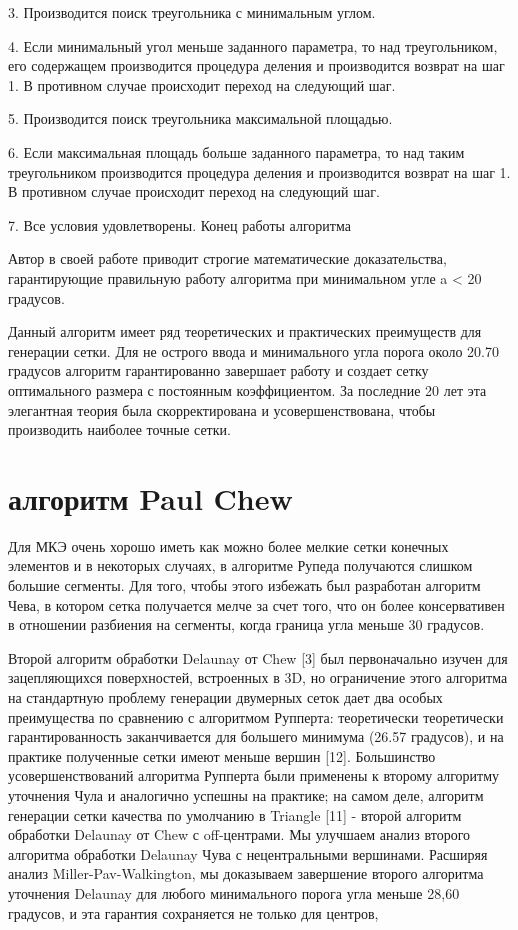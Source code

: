 \documentclass[14pt]{extreport}
\begin{document}
3. Производится поиск треугольника с минимальным углом.

4. Если минимальный угол меньше заданного параметра, то над треугольником, его содержащем производится процедура деления и производится возврат на шаг 1. В противном случае происходит переход на следующий шаг.

5. Производится поиск треугольника максимальной площадью.

6. Если максимальная площадь больше заданного параметра, то над таким треугольником производится процедура деления и производится возврат на шаг 1. В противном случае происходит переход на следующий шаг.

7. Все условия удовлетворены. Конец работы алгоритма

Автор в своей работе приводит строгие математические доказательства, гарантирующие правильную работу алгоритма при минимальном угле a < 20 градусов. 

Данный алгоритм имеет ряд теоретических и практических преимуществ для генерации сетки.  Для не острого ввода и минимального угла порога около 20.70 градусов алгоритм гарантированно завершает работу и создает сетку оптимального размера с постоянным коэффициентом. За последние 20 лет эта элегантная теория была скорректирована и усовершенствована, чтобы производить наиболее точные сетки.

\section{алгоритм Paul Chew}

Для МКЭ очень хорошо иметь как можно более мелкие сетки конечных элементов и в некоторых случаях, в алгоритме Рупеда получаются слишком большие сегменты. Для того, чтобы этого избежать был разработан алгоритм Чева, в котором сетка получается мелче за счет того, что он более консервативен в отношении разбиения на сегменты, когда граница угла меньше 30 градусов. 




 Второй алгоритм обработки Delaunay от Chew [3] был первоначально изучен для зацепляющихся поверхностей, встроенных в 3D, но ограничение этого алгоритма на стандартную проблему генерации двумерных сеток дает два особых преимущества по сравнению с алгоритмом Рупперта: теоретически теоретически гарантированность заканчивается для большего минимума (26.57 градусов), и на практике полученные сетки имеют меньше вершин [12]. Большинство усовершенствований алгоритма Рупперта были применены к второму алгоритму уточнения Чула и аналогично успешны на практике; на самом деле, алгоритм генерации сетки качества по умолчанию в Triangle [11] - второй алгоритм обработки Delaunay от Chew с off-центрами. Мы улучшаем анализ второго алгоритма обработки Delaunay Чува с нецентральными вершинами. Расширяя анализ Miller-Pav-Walkington, мы доказываем завершение второго алгоритма уточнения Delaunay для любого минимального порога угла меньше 28,60 градусов, и эта гарантия сохраняется не только для центров, 
\end{document}
